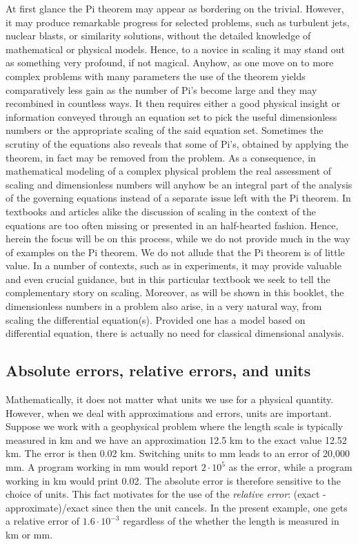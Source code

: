 \documentclass[graybox,envcountchap,sectrefs,final]{svmonodo}
\begin{document}
At first glance the Pi theorem may appear as bordering on the
trivial. However, it may produce remarkable progress for selected
problems, such as turbulent jets, nuclear blasts, or similarity
solutions, without the detailed knowledge of mathematical or physical
models. Hence, to a novice in scaling it may stand out as something
very profound, if not magical.  Anyhow, as one move on to more complex
problems with many parameters the use of the theorem yields
comparatively less gain as the number of Pi's become large and they
may recombined in countless ways. It then requires either a good
physical insight or information conveyed through an equation set to
pick the useful dimensionless numbers or the appropriate scaling of
the said equation set.  Sometimes the scrutiny of the equations also
reveals that some of Pi's, obtained by applying the theorem, in fact
may be removed from the problem.  As a consequence, in mathematical
modeling of a complex physical problem the real assessment of scaling
and dimensionless numbers will anyhow be an integral part of the
analysis of the governing equations instead of a separate issue left
with the Pi theorem. In textbooks and articles alike the discussion of
scaling in the context of the equations are too often missing or
presented in an half-hearted fashion. Hence, herein the focus will be
on this process, while we do not provide much in the way of examples
on the Pi theorem.  We do not allude that the Pi theorem is of little
value.  In a number of contexts, such as in experiments, it may
provide valuable and even crucial guidance, but in this particular
textbook we seek to tell the complementary story on scaling.
Moreover, as will be shown in this booklet, the dimensionless numbers in
a problem also arise, in a very natural way, from scaling the
differential equation(s).  Provided one has a model based on
differential equation, there is actually no need for classical
dimensional analysis.


\subsection{Absolute errors, relative errors, and units}

Mathematically, it does not matter what units we use for a physical
quantity. However, when we deal with approximations and errors,
units are important. Suppose we work with a geophysical problem where
the length scale is typically measured in km and we have an approximation
12.5 km to the exact value 12.52 km. The error is then 0.02 km.
Switching units to mm leads to an error of 20,000 mm. A program working
in mm would report $2\cdot 10^5$ as the error, while a program working
in km would print 0.02. The absolute error is therefore sensitive to
the choice of units. This fact motivates for the use of the \emph{relative
error}: (exact - approximate)/exact since then the unit cancels.
In the present example, one gets a relative error of $1.6\cdot 10^{-3}$
regardless of the whether the length is measured in km or mm.
\end{document}
